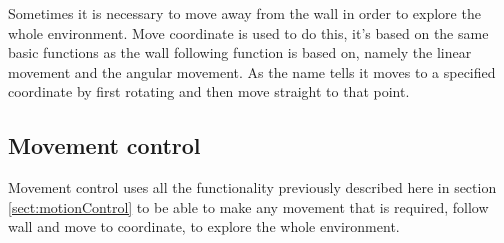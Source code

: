 Sometimes it is necessary to move away from the wall in order to explore the whole environment. Move coordinate is used to do this, it’s based on the same basic functions as the wall following function is based on, namely the linear movement and the angular movement. As the name tells it moves to a specified coordinate by first rotating and then move straight to that point.

\subsection{Movement control}

Movement control uses all the functionality previously described here in section \ref{sect:motionControl} to be able to make any movement that is required, follow wall and move to coordinate, to explore the whole environment.